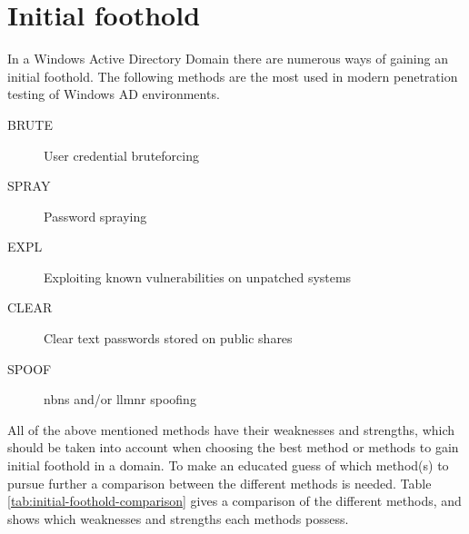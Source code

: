 \documentclass{article}
\begin{document}
\section{Initial foothold}
\label{sec:initial-foothold}
In a Windows Active Directory Domain there are numerous ways of gaining an initial foothold. The following methods are the most used in modern penetration testing of Windows AD environments.
\begin{description}
	\item[BRUTE] User credential bruteforcing
	\item[SPRAY] Password spraying
	\item[EXPL]Exploiting known vulnerabilities on unpatched systems
	\item[CLEAR] Clear text passwords stored on public shares
	\item[SPOOF] \gls{nbns} and/or \gls{llmnr} spoofing
\end{description}

All of the above mentioned methods have their weaknesses and strengths, which should be taken into account when choosing the best method or methods to gain initial foothold in a domain. To make an educated guess of which method(s) to pursue further a comparison between the different methods is needed. Table \ref{tab:initial-foothold-comparison} gives a comparison of the different methods, and shows which weaknesses and strengths each methods possess.
\end{document}
